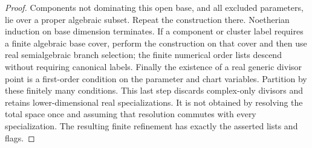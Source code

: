 \begin{proof}
Components not dominating this open base, and all excluded parameters,
lie over a proper algebraic subset. Repeat the construction there.
Noetherian induction on base dimension terminates. If a component or
cluster label requires a finite algebraic base cover, perform the
construction on that cover and then use real semialgebraic branch
selection; the finite numerical order lists descend without requiring
canonical labels. Finally the existence of a real generic divisor
point is a first-order condition on the parameter and chart variables.
Partition by these finitely many conditions. This last step discards
complex-only divisors and retains lower-dimensional real specializations.
It is not obtained by resolving the total space once and assuming that
resolution commutes with every specialization. The resulting finite
refinement has exactly the asserted lists and flags.
\end{proof}

